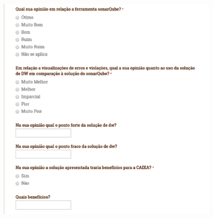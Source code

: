 \begin{apendicesenv}
\begin{figure}[h!]
\centering
\includegraphics[keepaspectratio=false,scale=0.60]{figuras/figuras_nilton/questionario4.eps}
\label{questionario4}
\end{figure}


\end{apendicesenv}